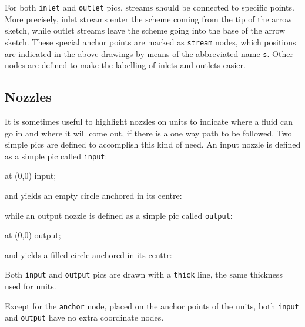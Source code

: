 \documentclass[12pt]{article}						%
\newcommand*{\chpn}[1]{\texttt{#1}}				%
\newcommand*{\chpp}[1]{\texttt{#1}}				%
\begin{document}
For both \chpp{inlet} and \chpp{outlet} pics, streams should be connected to
specific points. More precisely, inlet streams enter the scheme coming from the
tip of the arrow sketch, while outlet streams leave the scheme going into the
base of the arrow sketch. These special anchor points are marked as
\chpn{stream} nodes, which positions are indicated in the above drawings by means
of the abbreviated name \chpn{s}. Other nodes are defined to make the labelling
of inlets and outlets easier.

\subsection{Nozzles}

It is sometimes useful to highlight nozzles on units to indicate where a fluid
can go in and where it will come out, if there is a one way path to be followed.
Two simple pics are defined to accomplish this kind of need. An input nozzle is
defined as a simple pic called \chpp{input}:
\begin{chpcode}
	\pic at (0,0) {input};
\end{chpcode}
and yields an empty circle anchored in its centre:
\begin{center}
\end{center}
while an output nozzle is defined as a simple pic called \chpp{output}:
\begin{chpcode}
	\pic at (0,0) {output};
\end{chpcode}
and yields a filled circle anchored in its centtr:
\begin{center}
\end{center}
Both \chpp{input} and \chpp{output} pics are drawn with a \verb|thick| line, the
same thickness used for units.

Except for the \chpn{anchor} node, placed on the anchor points of the units,
both \chpp{input} and \chpp{output} have no extra coordinate nodes.
\end{document}
